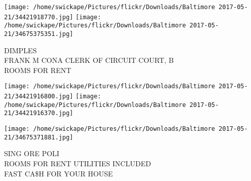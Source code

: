 \documentclass[10pt,letterpaper]{article}
\begin{document}
\vspace{0.25in}
\texttt{[image: /home/swickape/Pictures/flickr/Downloads/Baltimore 2017-05-21/34421918770.jpg]}
\texttt{[image: /home/swickape/Pictures/flickr/Downloads/Baltimore 2017-05-21/34675375351.jpg]}

DIMPLES\\
FRANK M CONA CLERK OF CIRCUIT COURT, B\\
ROOMS FOR RENT\\
\pagebreak

\texttt{[image: /home/swickape/Pictures/flickr/Downloads/Baltimore 2017-05-21/34421916800.jpg]}
\texttt{[image: /home/swickape/Pictures/flickr/Downloads/Baltimore 2017-05-21/34421916370.jpg]}

\texttt{[image: /home/swickape/Pictures/flickr/Downloads/Baltimore 2017-05-21/34675371881.jpg]}

SING ORE POLI\\
ROOMS FOR RENT UTILITIES INCLUDED\\
FAST CA\$H FOR YOUR HOUSE\\
\pagebreak
\end{document}
